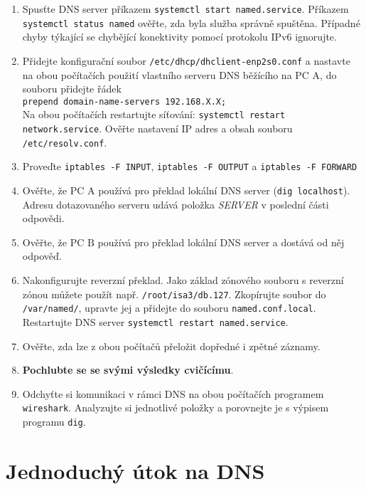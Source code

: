 \begin{enumerate}
  \item Spusťte DNS server příkazem {\tt systemctl start named.service}.
    Příkazem {\tt systemctl status named} ověřte, zda byla služba správně spuštěna.
    Případné chyby týkající se chybějící konektivity pomocí protokolu IPv6 ignorujte.
  \item Přidejte konfigurační soubor {\tt /etc/dhcp/dhclient-enp2s0.conf} a nastavte na obou počítačích
    použití vlastního serveru DNS běžícího na PC A, do souboru přidejte řádek \\
    {\tt prepend domain-name-servers 192.168.X.X;} \\ 
    Na obou počítačích restartujte síťování: {\tt systemctl restart network.service}.
    Ověřte nastavení IP adres a obsah souboru {\tt /etc/resolv.conf}.
  \item Proveďte {\tt iptables -F INPUT}, {\tt iptables -F OUTPUT} a {\tt iptables -F FORWARD}
  \item Ověřte, že PC A používá pro překlad lokální DNS server ({\tt dig
    localhost}). Adresu dotazovaného serveru udává položka {\em SERVER} v
    poslední části odpovědi.
  \item Ověřte, že PC B používá pro překlad lokální DNS server a dostává od něj odpověď.

  \item Nakonfigurujte reverzní překlad. Jako základ
    zónového souboru s reverzní zónou můžete použít např. {\tt /root/isa3/db.127}.
    Zkopírujte soubor do {\tt /var/named/}, upravte jej a přidejte do
    souboru {\tt named.conf.local}. Restartujte DNS server {\tt systemctl restart named.service}.

  \item Ověřte, zda lze z obou počítačů přeložit dopředné i zpětné záznamy.
  \item {\bf Pochlubte se se svými výsledky cvičícímu}.
  \item Odchyťte si komunikaci v rámci DNS na obou počítačích programem
    {\tt wireshark}. Analyzujte si jednotlivé položky a porovnejte je s výpisem
    programu {\tt dig}.

\end{enumerate}

\section{Jednoduchý útok na DNS}

